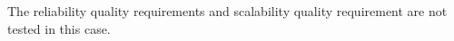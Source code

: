 The reliability quality requirements and scalability quality requirement are not tested in this case.